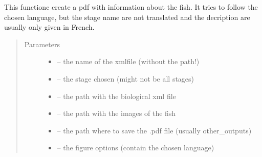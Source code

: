 \documentclass[letterpaper,10pt,english]{sphinxmanual}
\begin{document}
\begin{fulllineitems}
\label{\detokenize{index:src.bio_info.create_pdf}}
This functionc create a pdf with information about the fish. It tries to follow the chosen language, but
the stage name are not translated and the decription are usually only given in French.
\begin{quote}\begin{description}
\item[{Parameters}] \leavevmode\begin{itemize}
\item {} 
 -- the name of the xmlfile (without the path!)

\item {} 
 -- the stage chosen (might not be all stages)

\item {} 
 -- the path with the biological xml file

\item {} 
 -- the path with the images of the fish

\item {} 
 -- the path where to save the .pdf file (usually other\_outputs)

\item {} 
 -- the figure options (contain the chosen language)

\end{itemize}

\end{description}\end{quote}

\end{fulllineitems}

\end{document}
